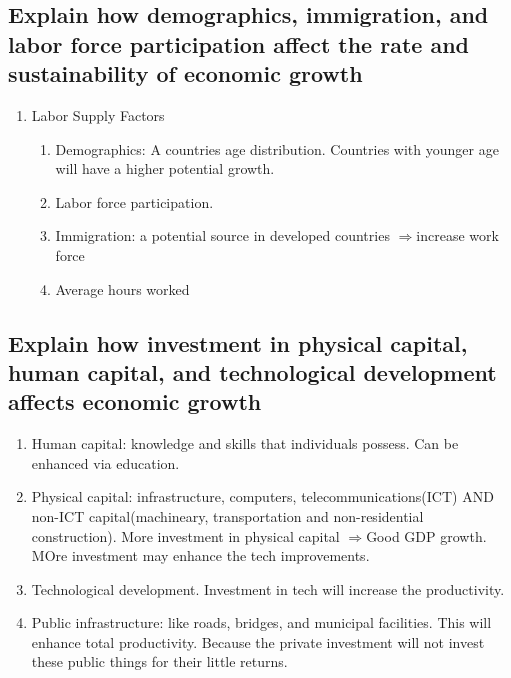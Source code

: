 \documentclass{article}
\newcommand{\be}{\begin{enumerate}}
\newcommand{\ee}{\end{enumerate}}
\newcommand{\Ra}{$\Rightarrow$}
\begin{document}
\subsection{Explain how demographics, immigration, and labor force participation
affect the rate and sustainability of economic growth}
\be
    \item Labor Supply Factors
        \be
            \item Demographics: A countries age distribution. Countries with younger
                age will have a higher potential growth.
            \item Labor force participation.
            \item Immigration: a potential source in developed countries \Ra increase work force
            \item Average hours worked
        \ee
\ee
\subsection{Explain how investment in physical capital, human capital, and technological
development affects economic growth}
\be
    \item Human capital: knowledge and skills that individuals possess. Can be enhanced
        via education.
    \item Physical capital: infrastructure, computers, telecommunications(ICT)
        AND non-ICT capital(machineary, transportation and non-residential construction).
        More investment in physical capital \Ra Good GDP growth.
        \\ MOre investment may enhance the tech improvements.
    \item Technological development. Investment in tech will increase the productivity.
    \item Public infrastructure: like roads, bridges, and municipal facilities. 
        This will enhance total productivity. Because the private investment will not
        invest these public things for their little returns.
\ee
\end{document}
